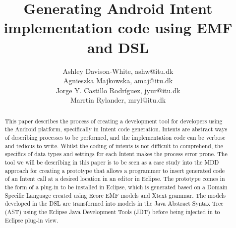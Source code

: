 \documentclass[10pt]{article}
\title{Generating Android Intent implementation code using EMF and DSL}
\author{Ashley Davison-White, ashw@itu.dk 
        \\Agnieszka Majkowska, amaj@itu.dk
        \\Jorge Y. Castillo Rodríguez, jyur@itu.dk
        \\Marrtin Rylander, mryl@itu.dk
}
\begin{document}
\maketitle

\begin{abstract}
This paper describes the process of creating a development tool for developers using the Android platform, specifically in Intent code generation.
Intents are abstract ways of describing processes to be performed, and the implementation code can be verbose and tedious to write. Whilst the coding of intents is not difficult to comprehend, the specifics of data types and settings for each Intent makes the process error prone. The tool we will be describing in this paper is to be seen as a case study into the MDD approach for creating a prototype that allows a programmer to insert generated code of an Intent call at a desired location in an editor in Eclipse. The prototype comes in the form of a plug-in to be installed in Eclipse, which is generated based on a Domain Specific Language created using Ecore EMF models and Xtext grammar.
The models developed in the DSL are transformed into models in the Java Abstract Syntax Tree (AST) using the Eclipse Java Development Tools (JDT) before being injected in to Eclipse plug-in view.   
\end{abstract}





















\setlength{\bibsep}{0.0pt}


\end{document}
